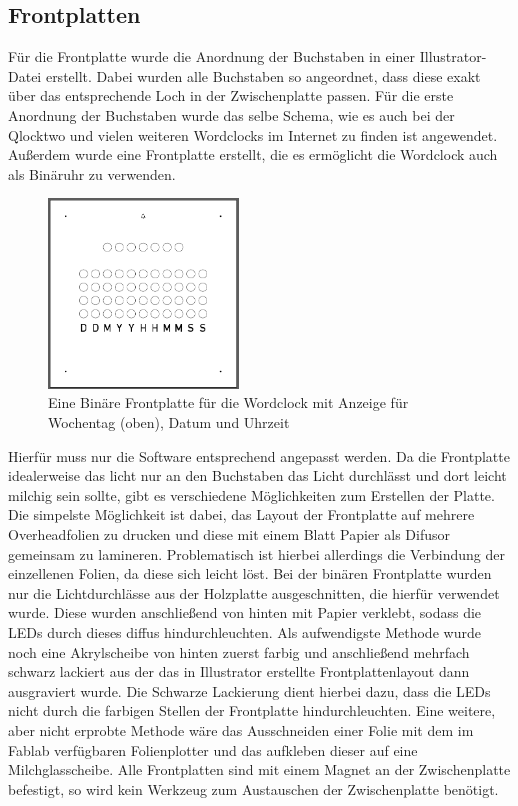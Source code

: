 \documentclass[12pt,journal,compsoc]{IEEEtran}
\begin{document}
\subsection{Frontplatten}
Für die Frontplatte wurde die Anordnung der Buchstaben in einer Illustrator-Datei erstellt. Dabei wurden alle Buchstaben so angeordnet, dass diese exakt über das entsprechende Loch in der Zwischenplatte passen. Für die erste Anordnung der Buchstaben wurde das selbe Schema, wie es auch bei der Qlocktwo und vielen weiteren Wordclocks im Internet zu finden ist angewendet. Außerdem wurde eine Frontplatte erstellt, die es ermöglicht die Wordclock auch als Binäruhr zu verwenden. 
\begin{figure}[h]
	\centering
	\includegraphics[width=0.45\textwidth]{Bilder/Frontplatte2}
	\caption{Eine Binäre Frontplatte für die Wordclock mit Anzeige für Wochentag (oben), Datum und Uhrzeit} 
	\label{fig:Frontplatte2}
\end{figure}
Hierfür muss nur die Software entsprechend angepasst werden. Da die Frontplatte idealerweise das licht nur an den Buchstaben das Licht durchlässt und dort leicht milchig sein sollte, gibt es  verschiedene Möglichkeiten zum Erstellen der Platte. Die simpelste Möglichkeit ist dabei, das Layout der Frontplatte auf mehrere Overheadfolien zu drucken und diese mit einem Blatt Papier als Difusor gemeinsam zu lamineren. Problematisch ist hierbei allerdings die Verbindung der einzellenen Folien, da diese sich leicht löst. Bei der binären Frontplatte wurden nur die Lichtdurchlässe aus der Holzplatte ausgeschnitten, die hierfür verwendet wurde. Diese wurden anschließend von hinten mit Papier verklebt, sodass die LEDs durch dieses diffus hindurchleuchten. Als aufwendigste Methode wurde noch eine Akrylscheibe von hinten zuerst farbig und anschließend mehrfach schwarz lackiert aus der das in Illustrator erstellte Frontplattenlayout dann ausgraviert wurde. Die Schwarze Lackierung dient hierbei dazu, dass die LEDs nicht durch die farbigen Stellen der Frontplatte hindurchleuchten. Eine weitere, aber nicht erprobte Methode wäre das Ausschneiden einer Folie mit dem im Fablab verfügbaren Folienplotter und das aufkleben dieser auf eine Milchglasscheibe. Alle Frontplatten sind mit einem Magnet an der Zwischenplatte befestigt, so wird kein Werkzeug zum Austauschen der Zwischenplatte benötigt.
\end{document}

